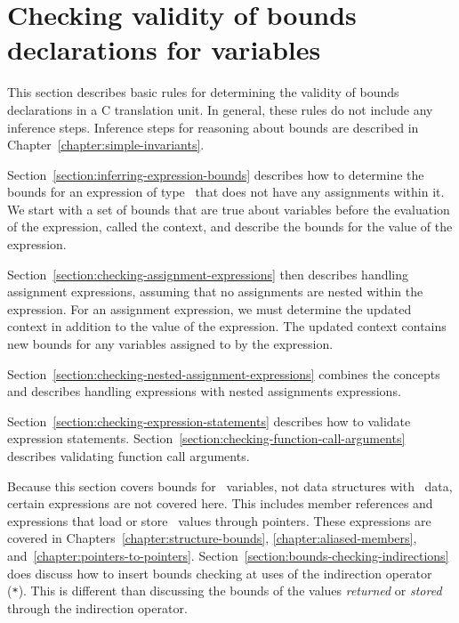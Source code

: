 
\chapter{Checking validity of bounds declarations for variables}
\label{chapter:checking-bounds}

This section describes basic rules for determining the validity of
bounds declarations in a C translation unit. In general, these rules do
not include any inference steps. Inference steps for reasoning about
bounds are described in Chapter~\ref{chapter:simple-invariants}.

Section~\ref{section:inferring-expression-bounds}
describes how to determine the bounds for an expression of
type \arrayptr\ that does not have any assignments within it.
We start with a set of bounds that are true about variables before the
evaluation of the expression, called the context, and describe the
bounds for the value of the expression.

Section~\ref{section:checking-assignment-expressions}
then describes handling assignment expressions, assuming
that no assignments are nested within the expression. For an assignment
expression, we must determine the updated context in addition to the
value of the expression. The updated context contains new bounds for any
variables assigned to by the expression.

Section~\ref{section:checking-nested-assignment-expressions}
combines the concepts and describes handling expressions
with nested assignments expressions.

Section~\ref{section:checking-expression-statements} 
describes how to validate expression statements. 
Section~\ref{section:checking-function-call-arguments}
describes validating function call arguments.

Because this section covers bounds for \arrayptr\ variables,
not data structures with \arrayptr\ data, certain expressions
are not covered here. This includes member references and expressions
that load or store \arrayptr\ values through pointers. These
expressions are covered in Chapters~\ref{chapter:structure-bounds}, 
\ref{chapter:aliased-members}, and~\ref{chapter:pointers-to-pointers}.
Section~\ref{section:bounds-checking-indirections} does discuss how to 
insert bounds checking at uses of the
indirection operator (\texttt{*}). This is different than discussing the
bounds of the values \emph{returned} or \emph{stored} through the
indirection operator.


